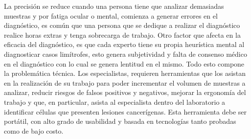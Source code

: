 La precisión se reduce cuando una persona tiene que analizar demasiadas muestras
y por fatiga ocular o mental, comienza a generar errores en el diagnóstico, es
común que una persona que se dedique a realizar el diagnóstico realice horas
extras y tenga sobrecarga de trabajo. Otro factor que afecta en la eficacia del
diagnóstico, es que cada experto tiene su propia heurística mental al
diagnosticar casos limítrofes, esto genera subjetividad y falta de consenso
médico en el diagnóstico con lo cual se genera lentitud en el mismo. Todo esto
compone la problemática técnica. Los especialistas, requieren herramientas que
los asistan en la realización de su trabajo para poder incrementar el volumen de
muestras a analizar, reducir riesgos de falsos positivos y negativos, mejorar la
ergonomía del trabajo y que, en particular, asista al especialista dentro del
laboratorio a identificar células que presenten lesiones cancerígenas. Esta
herramienta debe ser portátil, con alto grado de usabilidad y basada en
tecnologías tanto probadas como de bajo costo.~\cite{Lugo-Reyes2014}
